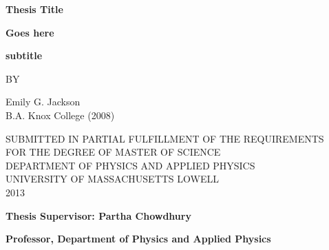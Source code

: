 \begin{center}
\par
\vspace*{0.5in}
{\bf\large Thesis Title}
\par
\vspace{0.15in}
{\bf\large Goes here}
\par
\vspace{0.15in}
{\bf\large subtitle}
\par
\vspace{0.2in}
{\bf\large }
\par
\vspace{0.6in}
{ BY}
\par
\vspace{0.6in}
{Emily G. Jackson}\\
{B.A. Knox College (2008)}
\par
\vspace{0.6in}
{SUBMITTED IN PARTIAL FULFILLMENT OF THE REQUIREMENTS}\\
{FOR THE DEGREE OF MASTER OF SCIENCE}\\
{DEPARTMENT OF PHYSICS AND APPLIED PHYSICS}\\
{UNIVERSITY OF MASSACHUSETTS LOWELL}\\
{2013}
\end{center}
\par
\vspace{0.6in}
{\bf Thesis Supervisor: Partha Chowdhury}
\par
\vspace{0.1in}
{\bf Professor, Department of Physics and Applied Physics}
\thispagestyle{empty}
